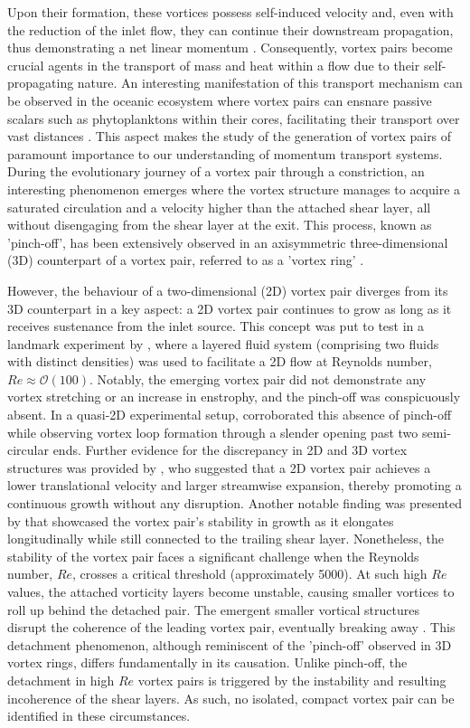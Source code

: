 \documentclass[final,3p,times,authoryear]{elsarticle}
\begin{document}
	Upon their formation, these vortices possess self-induced velocity and, even with the reduction of the inlet flow, they can continue their downstream propagation, thus demonstrating a net linear momentum \citep{Barker1977}. Consequently, vortex pairs become crucial agents in the transport of mass and heat within a flow due to their self-propagating nature. An interesting manifestation of this transport mechanism can be observed in the oceanic ecosystem where vortex pairs can ensnare passive scalars such as phytoplanktons within their cores, facilitating their transport over vast distances \citep{Provenzale1999}. This aspect makes the study of the generation of vortex pairs of paramount importance to our understanding of momentum transport systems. During the evolutionary journey of a vortex pair through a constriction, an interesting phenomenon emerges where the vortex structure manages to acquire a saturated circulation and a velocity higher than the attached shear layer, all without disengaging from the shear layer at the exit. This process, known as 'pinch-off', has been extensively observed in an axisymmetric three-dimensional (3D) counterpart of a vortex pair, referred to as a 'vortex ring' \citep{Gharib1998}.
	
	However, the behaviour of a two-dimensional (2D) vortex pair diverges from its 3D counterpart in a key aspect: a 2D vortex pair continues to grow as long as it receives sustenance from the inlet source. This concept was put to test in a landmark experiment by \cite{Afanasyev2006}, where a layered fluid system (comprising two fluids with distinct densities) was used to facilitate a 2D flow at Reynolds number, $Re \approx\mathcal{O}(100)$. Notably, the emerging vortex pair did not demonstrate any vortex stretching or an increase in enstrophy, and the pinch-off was conspicuously absent. In a quasi-2D experimental setup, \cite{domenichini_2011} corroborated this absence of pinch-off while observing vortex loop formation through a slender opening past two semi-circular ends. Further evidence for the discrepancy in 2D and 3D vortex structures was provided by \cite{ofarrell_dabiri_2012}, who suggested that a 2D vortex pair achieves a lower translational velocity and larger streamwise expansion, thereby promoting a continuous growth without any disruption. Another notable finding was presented by \cite{pedrizzetti_2010} that showcased the vortex pair's stability in growth as it elongates longitudinally while still connected to the trailing shear layer. Nonetheless, the stability of the vortex pair faces a significant challenge when the Reynolds number, $Re$, crosses a critical threshold (approximately 5000). At such high $Re$ values, the attached vorticity layers become unstable, causing smaller vortices to roll up behind the detached pair. The emergent smaller vortical structures disrupt the coherence of the leading vortex pair, eventually breaking away \citep{luchini_tognaccini_2002}. This detachment phenomenon, although reminiscent of the 'pinch-off' observed in 3D vortex rings, differs fundamentally in its causation. Unlike pinch-off, the detachment in high $Re$ vortex pairs is triggered by the instability and resulting incoherence of the shear layers. As such, no isolated, compact vortex pair can be identified in these circumstances. 
	
\end{document}
